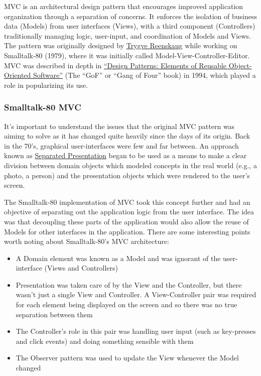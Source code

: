 \documentclass[9pt]{book}
\begin{document}
MVC is an architectural design pattern that encourages improved
application organization through a separation of concerns. It enforces
the isolation of business data (Models) from user interfaces (Views),
with a third component (Controllers) traditionally managing logic,
user-input, and coordination of Models and Views. The pattern was
originally designed by
\href{http://en.wikipedia.org/wiki/Trygve_Reenskaug}{Trygve Reenskaug}
while working on Smalltalk-80 (1979), where it was initially called
Model-View-Controller-Editor. MVC was described in depth in
\href{http://www.amazon.co.uk/Design-patterns-elements-reusable-object-oriented/dp/0201633612}{``Design
Patterns: Elements of Reusable Object-Oriented Software''} (The ``GoF''
or ``Gang of Four'' book) in 1994, which played a role in popularizing
its use.

\subsubsection{Smalltalk-80 MVC}\label{smalltalk-80-mvc}

It's important to understand the issues that the original MVC pattern
was aiming to solve as it has changed quite heavily since the days of
its origin. Back in the 70's, graphical user-interfaces were few and far
between. An approach known as
\href{http://martinfowler.com/eaaDev/uiArchs.html}{Separated
Presentation} began to be used as a means to make a clear division
between domain objects which modeled concepts in the real world (e.g., a
photo, a person) and the presentation objects which were rendered to the
user's screen.

The Smalltalk-80 implementation of MVC took this concept further and had
an objective of separating out the application logic from the user
interface. The idea was that decoupling these parts of the application
would also allow the reuse of Models for other interfaces in the
application. There are some interesting points worth noting about
Smalltalk-80's MVC architecture:

\begin{itemize}
\itemsep1pt\parskip0pt
\item
  A Domain element was known as a Model and was ignorant of the
  user-interface (Views and Controllers)
\item
  Presentation was taken care of by the View and the Controller, but
  there wasn't just a single View and Controller. A View-Controller pair
  was required for each element being displayed on the screen and so
  there was no true separation between them
\item
  The Controller's role in this pair was handling user input (such as
  key-presses and click events) and doing something sensible with them
\item
  The Observer pattern was used to update the View whenever the Model
  changed
\end{itemize}
\end{document}
